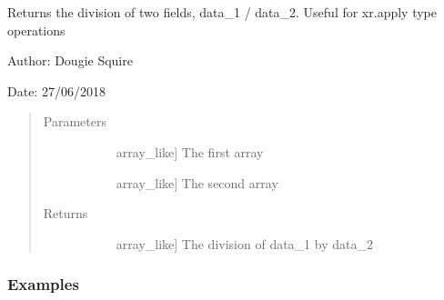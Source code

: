 \documentclass[letterpaper,10pt,english]{sphinxmanual}
\begin{document}
\begin{fulllineitems}
\label{\detokenize{utils_doc:utils.divide}}
Returns the division of two fields, data\_1 / data\_2. Useful for xr.apply type operations

\begin{DUlineblock}{0em}
\item[] Author: Dougie Squire
\item[] Date: 27/06/2018
\end{DUlineblock}
\begin{quote}\begin{description}
\item[{Parameters}] \leavevmode\begin{description}
\item[{}] \leavevmode{[}array\_like{]}
The first array

\item[{}] \leavevmode{[}array\_like{]}
The second array

\end{description}

\item[{Returns}] \leavevmode\begin{description}
\item[{}] \leavevmode{[}array\_like{]}
The division of data\_1 by data\_2

\end{description}

\end{description}\end{quote}
\subsubsection*{Examples}


\end{fulllineitems}
\end{document}
